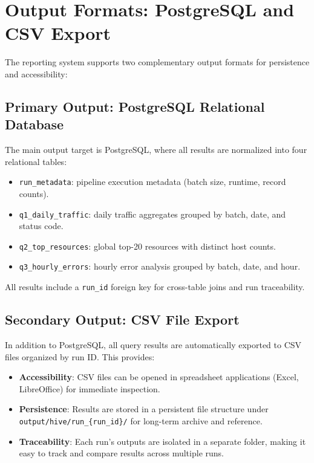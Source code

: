 \documentclass[12pt,a4paper]{article}
\begin{document}
\section{Output Formats: PostgreSQL and CSV Export}

The reporting system supports two complementary output formats for persistence and accessibility:

\subsection{Primary Output: PostgreSQL Relational Database}
The main output target is PostgreSQL, where all results are normalized into four relational tables:
\begin{itemize}
    \item \texttt{run\_metadata}: pipeline execution metadata (batch size, runtime, record counts).
    \item \texttt{q1\_daily\_traffic}: daily traffic aggregates grouped by batch, date, and status code.
    \item \texttt{q2\_top\_resources}: global top-20 resources with distinct host counts.
    \item \texttt{q3\_hourly\_errors}: hourly error analysis grouped by batch, date, and hour.
\end{itemize}
All results include a \texttt{run\_id} foreign key for cross-table joins and run traceability.

\subsection{Secondary Output: CSV File Export}
In addition to PostgreSQL, all query results are automatically exported to CSV files organized by run ID. This provides:
\begin{itemize}
    \item \textbf{Accessibility}: CSV files can be opened in spreadsheet applications (Excel, LibreOffice) for immediate inspection.
    \item \textbf{Persistence}: Results are stored in a persistent file structure under \texttt{output/hive/run\_\{run\_id\}/} for long-term archive and reference.
    \item \textbf{Traceability}: Each run's outputs are isolated in a separate folder, making it easy to track and compare results across multiple runs.
\end{itemize}
\end{document}
